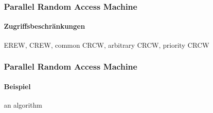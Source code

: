 \begin{frame}
    \frametitle{Parallel Random Access Machine}
    \framesubtitle{Zugriffsbeschränkungen}
    EREW, CREW, common CRCW, arbitrary CRCW, priority CRCW
\end{frame}

\begin{frame}
    \frametitle{Parallel Random Access Machine}
    \framesubtitle{Beispiel}
    an algorithm
\end{frame}
